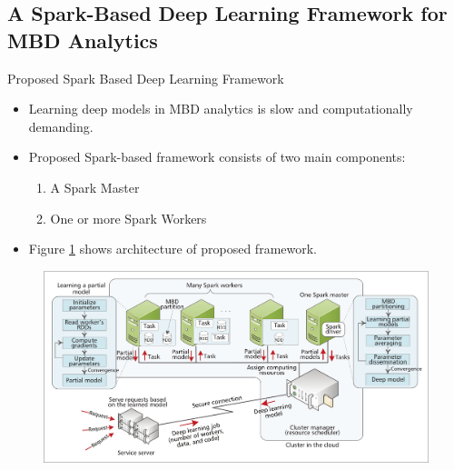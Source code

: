 \documentclass[newPxFont]{beamer}
\begin{document}
\subsection{A Spark-Based Deep Learning Framework for MBD Analytics}
\begin{frame}[allowframebreaks]{Proposed Spark Based Deep Learning Framework}
	\begin{itemize}
		\item{Learning deep models in MBD analytics is slow and computationally demanding.}
        
        \vspace{1em}
        
    	\item{
        	Proposed Spark-based framework consists of two main components:
        	\begin{enumerate}
            	\vspace{0.5em}
            	\item{A Spark Master}
                \vspace{0.5em}
                \item{One or more Spark Workers}
            \end{enumerate}
        }
        
        \vspace{1em}
        
        \item{Figure \ref{fig:proposedFramework} shows architecture of proposed framework.}
    \end{itemize}

\vspace{2em}

	\begin{figure}
		\centering
		\includegraphics[width=1\linewidth]{resources/sparkmodel.png}
        \label{fig:proposedFramework}
	\end{figure}

\end{frame}
\end{document}
